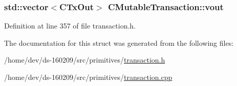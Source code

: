 \hypertarget{struct_c_mutable_transaction_aca14a252c78e4af2dfe68d7ea67a77dc}{}
\subsubsection[{vout}]{\setlength{\rightskip}{0pt plus 5cm}std\+::vector$<${\bf C\+Tx\+Out}$>$ C\+Mutable\+Transaction\+::vout}\label{struct_c_mutable_transaction_aca14a252c78e4af2dfe68d7ea67a77dc}


Definition at line 357 of file transaction.\+h.



The documentation for this struct was generated from the following files\+:\begin{DoxyCompactItemize}
\item 
/home/dev/ds-\/160209/src/primitives/\hyperlink{transaction_8h}{transaction.\+h}\item 
/home/dev/ds-\/160209/src/primitives/\hyperlink{transaction_8cpp}{transaction.\+cpp}\end{DoxyCompactItemize}
